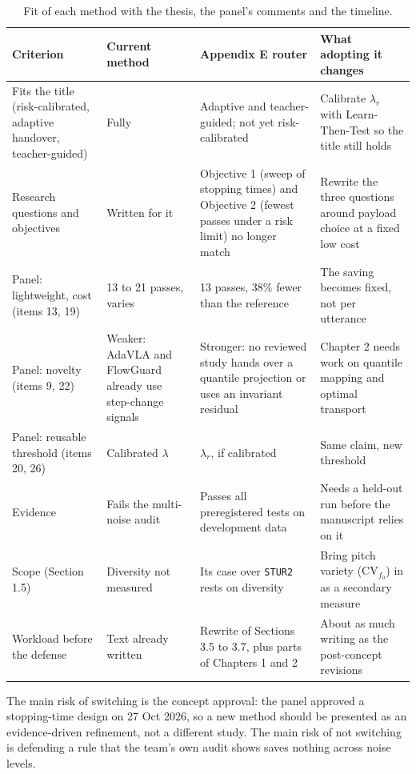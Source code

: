 \documentclass[11pt,a4paper]{article}
\begin{document}
\begin{table}[!htbp]
\centering\small
\caption{Fit of each method with the thesis, the panel's comments and the timeline.}
\label{tab:suit}
\begin{tabularx}{\textwidth}{@{}P{3.0cm} L L L@{}}
\toprule
\textbf{Criterion} & \textbf{Current method} & \textbf{Appendix E router} & \textbf{What adopting it changes} \\
\midrule
Fits the title (risk-calibrated, adaptive handover, teacher-guided) & Fully & Adaptive and teacher-guided; not yet risk-calibrated & Calibrate $\lambda_r$ with Learn-Then-Test so the title still holds \\
Research questions and objectives & Written for it & Objective 1 (sweep of stopping times) and Objective 2 (fewest passes under a risk limit) no longer match & Rewrite the three questions around payload choice at a fixed low cost \\
Panel: lightweight, cost (items 13, 19) & 13 to 21 passes, varies & 13 passes, 38\% fewer than the reference & The saving becomes fixed, not per utterance \\
Panel: novelty (items 9, 22) & Weaker: AdaVLA and FlowGuard already use step-change signals & Stronger: no reviewed study hands over a quantile projection or uses an invariant residual & Chapter 2 needs work on quantile mapping and optimal transport \\
Panel: reusable threshold (items 20, 26) & Calibrated $\lambda$ & $\lambda_r$, if calibrated & Same claim, new threshold \\
Evidence & Fails the multi-noise audit & Passes all preregistered tests on development data & Needs a held-out run before the manuscript relies on it \\
Scope (Section 1.5) & Diversity not measured & Its case over \texttt{STUR2} rests on diversity & Bring pitch variety ($\mathrm{CV}_{f_0}$) in as a secondary measure \\
Workload before the defense & Text already written & Rewrite of Sections 3.5 to 3.7, plus parts of Chapters 1 and 2 & About as much writing as the post-concept revisions \\
\bottomrule
\end{tabularx}
\end{table}

The main risk of switching is the concept approval: the panel approved a stopping-time design on 27 Oct 2026, so a new method should be presented as an evidence-driven refinement, not a different study. The main risk of not switching is defending a rule that the team's own audit shows saves nothing across noise levels.
\end{document}

